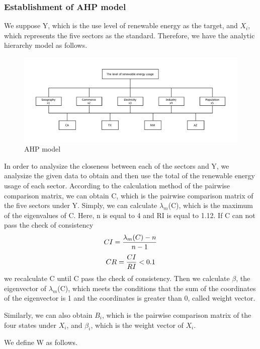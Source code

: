 \documentclass[a4paper,11pt]{article}
\begin{document}
\subsubsection{Establishment of AHP model}
\par We suppose Y, which is the use level of renewable energy as the target, and $X_i$, which represents the five sectors as the standard. Therefore, we have the analytic hierarchy model as follows.\cite{6}
\begin{figure}[!hptb] 
    \centering 
    \includegraphics[width=1.0\textwidth]{AHP.pdf}
    \caption{AHP model}
\end{figure}
\par In order to analysize the closeness between each of the sectors and Y, we analysize the given data to obtain and then use the total of the renewable energy usage of each sector. According to the calculation method of the pairwise comparison matrix, we can obtain C, which is the pairwise comparison matrix of the five sectors under Y. Simply, we can calculate $\lambda_m$(C), which is the maximum of the eigenvalues of C. Here, n is equal to 4 and RI is equal to 1.12.\cite{6} If C can not pass the check of consistency
\begin{equation}
    \centering
    CI=\frac{ \lambda_m(C)-n }{ n-1 }
\end{equation}
\begin{equation}
        \centering
    CR=\frac{ CI }{ RI }<0.1 
\end{equation}
we recalculate C until C pass the check of consistency. Then we calculate $\beta$, the eigenvector of $\lambda_m$(C), which meets the conditions that the sum of the coordinates of the eigenvector is 1 and the coordinates is greater than 0, called weight vector.
\par Similarly, we can also obtain $B_i$, which is the pairwise comparison matrix of the four states under $X_i$, and $\beta_i$, which is the weight vector of $X_i$.
\par We define W as follows.
\end{document}

